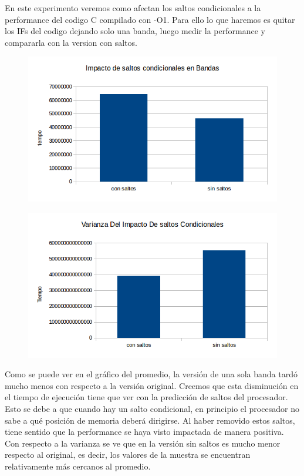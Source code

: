 \documentclass[a4paper]{article}
\begin{document}
En este experimento veremos como afectan los saltos condicionales a la performance del codigo C compilado con -O1. Para ello lo que haremos es quitar los IFs del codigo dejando solo una banda, luego medir la performance y compararla con la version con saltos.

\begin{figure}[h!]
  \begin{center}
  \includegraphics[scale=0.66]{Graficos3.1/per.png}
  \label{nombreparareferenciar1}
  \end{center}
\end{figure}

\begin{figure}[h!]
  \begin{center}
  \includegraphics[scale=0.66]{Graficos3.1/var.png}
  \label{nombreparareferenciar1}
  \end{center}
\end{figure}

Como se puede ver en el gráfico del promedio, la versión de una sola banda tardó mucho menos con respecto a la versión original. Creemos que esta disminución en el tiempo de ejecución tiene que ver con la predicción de saltos del procesador. Esto se debe a que cuando hay un salto condicional, en principio el procesador no sabe a qué posición de memoria deberá dirigirse. Al haber removido estos saltos, tiene sentido que la performance se haya visto impactada de manera positiva. Con respecto a la varianza se ve que en la versión sin saltos es mucho menor respecto al original, es decir, los valores de la muestra se encuentran relativamente más cercanos al promedio.
\end{document}
